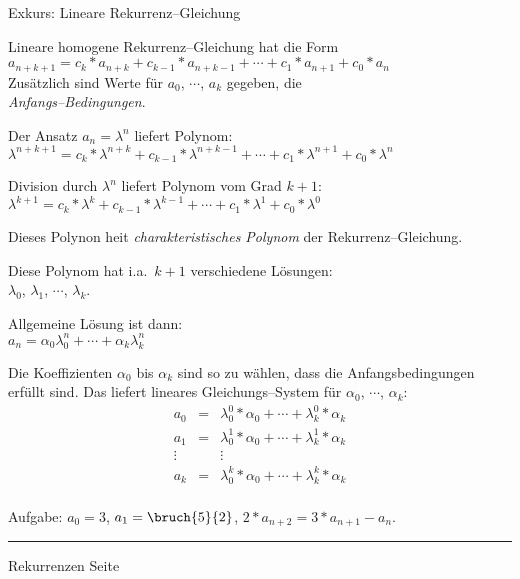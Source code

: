 \begin{slide}{}
\normalsize

\begin{center}
Exkurs: Lineare Rekurrenz--Gleichung
\end{center}
\vspace*{0.5cm}

\footnotesize
Lineare homogene Rekurrenz--Gleichung hat die Form \\[0.3cm]
\hspace*{0.3cm} $a_{n+k+1} = c_k * a_{n+k} + c_{k-1} * a_{n+k-1} + \cdots + c_1 * a_{n+1} + c_0 * a_{n}$ \\[0.3cm]
Zus\"atzlich sind Werte f\"ur $a_0$, $\cdots$, $a_k$ gegeben, die \\
\emph{\sl Anfangs--Bedingungen}.

Der Ansatz $a_n = \lambda^n$ liefert Polynom: \\[0.3cm]
\hspace*{1.3cm} $\lambda^{n+k+1} = c_k * \lambda^{n+k} + c_{k-1} * \lambda^{n+k-1} + \cdots + c_1 * \lambda^{n+1} + c_0 * \lambda^{n}$

Division durch $\lambda^n$ liefert Polynom vom Grad $k+1$: \\[0.3cm]
\hspace*{1.3cm} $\lambda^{k+1} = c_k * \lambda^{k} + c_{k-1} * \lambda^{k-1} + \cdots + c_1 * \lambda^{1} + c_0 * \lambda^{0}$ 

Dieses Polynon hei\3t \emph{charakteristisches Polynom} der Rekurrenz--Gleichung.

Diese Polynom hat i.a.~$k+1$ verschiedene L\"osungen: \\[0.3cm]
\hspace*{1.3cm}  $\lambda_0$, $\lambda_1$, $\cdots$, $\lambda_k$.

Allgemeine L\"osung ist dann: \\[0.3cm]
\hspace*{1.3cm} $a_n = \alpha_0 \lambda_0^n + \cdots + \alpha_k \lambda_k^n$

Die Koeffizienten $\alpha_0$ bis $\alpha_k$ sind so zu w\"ahlen, dass die Anfangsbedingungen 
erf\"ullt sind.  Das liefert lineares Gleichungs--System f\"ur $\alpha_0$, $\cdots$, $\alpha_k$:
$$
\begin{array}{lcl}
  a_0 & = & \lambda_0^0 * \alpha_0 + \cdots +   \lambda_k^0 * \alpha_k \\[0.3cm]
  a_1 & = & \lambda_0^1 * \alpha_0 + \cdots +   \lambda_k^1 * \alpha_k \\[0.3cm]
  \vdots &  & \vdots                                                   \\[0.3cm]
  a_k & = & \lambda_0^k * \alpha_0 + \cdots +   \lambda_k^k * \alpha_k \\[0.3cm]
\end{array}
$$

Aufgabe: $a_0 = 3$, $a_1 = \bruch{5}{2}$, $2 * a_{n+2} = 3 * a_{n+1} - a_n$.
\vspace*{\fill}
\tiny \addtocounter{mypage}{1}
\rule{17cm}{1mm}
Rekurrenzen  \hspace*{\fill} Seite 
\end{slide}

